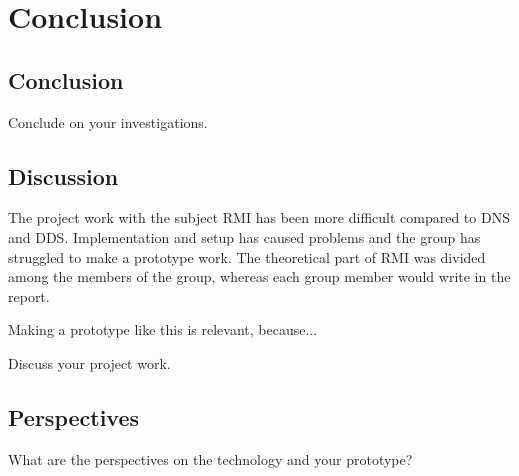 \chapter{Conclusion}
\section{Conclusion}

Conclude on your investigations.
\section{Discussion}
The project work with the subject RMI has been more difficult compared to DNS and DDS.
Implementation and setup has caused problems and the group has struggled to make a prototype work.
The theoretical part of RMI was divided among the members of the group, whereas each group member would write in the report.

Making a prototype like this is relevant, because...

Discuss your project work.

\section{Perspectives}
What are the perspectives on the technology and your prototype? 